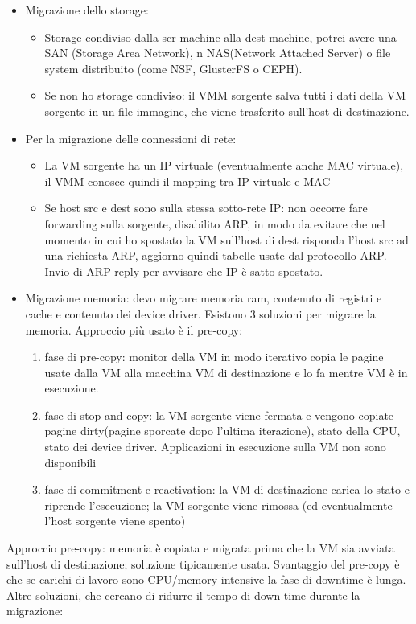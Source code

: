 \documentclass{article}
\begin{document}
\begin{itemize}
\item Migrazione dello storage:
\begin{itemize}
\item Storage condiviso dalla scr machine alla dest machine, potrei avere una SAN (Storage Area Network), n NAS(Network Attached Server) o file system distribuito (come NSF, GlusterFS o CEPH).
\item Se non ho storage condiviso: il VMM sorgente salva tutti i dati della VM sorgente in un file immagine, che viene trasferito sull'host di destinazione.
\end{itemize}
\item Per la migrazione delle connessioni di rete:
\begin{itemize}
\item La VM sorgente ha un IP virtuale (eventualmente anche MAC virtuale), il VMM conosce quindi il mapping tra IP virtuale e MAC
\item Se host src e dest sono sulla stessa sotto-rete IP: non occorre fare forwarding sulla sorgente, disabilito ARP, in modo da evitare che nel momento in cui ho spostato la VM sull'host di dest risponda l'host src ad una richiesta ARP, aggiorno quindi tabelle usate dal protocollo ARP. Invio di ARP reply per avvisare che IP è satto spostato.
\end{itemize}
\item Migrazione memoria: devo migrare memoria ram, contenuto di registri e cache e contenuto dei device driver. Esistono 3 soluzioni per migrare la memoria. Approccio più usato è il pre-copy: 
\begin{enumerate}
\item fase di pre-copy: monitor della VM in modo iterativo copia le pagine usate dalla VM alla macchina VM di destinazione e lo fa mentre VM è in esecuzione.
\item fase di stop-and-copy: la VM sorgente viene fermata e vengono copiate pagine dirty(pagine sporcate dopo l'ultima iterazione), stato della CPU, stato dei device driver. Applicazioni in esecuzione sulla VM non sono disponibili
\item fase di commitment e reactivation: la VM di destinazione carica lo stato e riprende l'esecuzione; la VM sorgente viene rimossa (ed eventualmente l'host sorgente viene spento)
\end{enumerate}
\end{itemize}
Approccio pre-copy: memoria è copiata e migrata prima che la VM sia avviata sull'host di destinazione; soluzione tipicamente usata. Svantaggio del pre-copy è che se carichi di lavoro sono CPU/memory intensive la fase di downtime è lunga. Altre soluzioni, che cercano di ridurre il tempo di down-time durante la migrazione:
\end{document}
